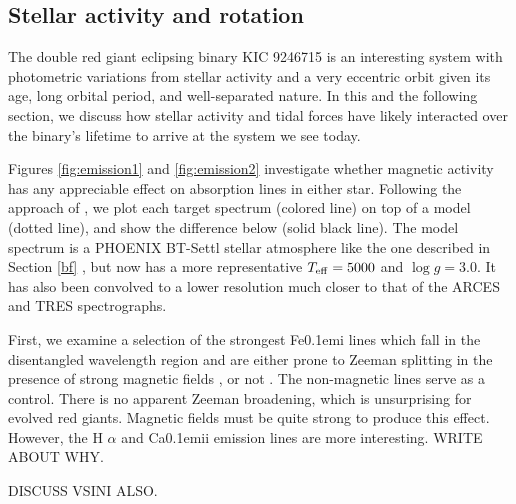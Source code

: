 \subsection{Stellar activity and rotation}\label{actrot}
The double red giant eclipsing binary KIC 9246715 is an interesting system with photometric variations from stellar activity and a very eccentric orbit given its age, long orbital period, and well-separated nature. In this and the following section, we discuss how stellar activity and tidal forces have likely interacted over the binary's lifetime to arrive at the system we see today.

Figures \ref{fig:emission1} and \ref{fig:emission2} investigate whether magnetic activity has any appreciable effect on absorption lines in either star. Following the approach of \citet{fro12}, we plot each target spectrum (colored line) on top of a model (dotted line), and show the difference below (solid black line). The model spectrum is a PHOENIX BT-Settl stellar atmosphere like the one described in Section \ref{bf} \citep{all03,asp09}, but now has a more representative $T_{\rm{eff}} = 5000$ and $\log g = 3.0$. It has also been convolved to a lower resolution much closer to that of the ARCES and TRES spectrographs.

First, we examine a selection of the strongest  {\rm Fe}\kern 0.1em{\sc i} lines which fall in the disentangled wavelength region and are either prone to Zeeman splitting in the presence of strong magnetic fields \citep{har73}, or not \citep{sis70}. The non-magnetic lines serve as a control. There is no apparent Zeeman broadening, which is unsurprising for evolved red giants. Magnetic fields must be quite strong to produce this effect. However, the H $\alpha$ and {\rm Ca}\kern 0.1em{\sc ii} emission lines are more interesting. WRITE ABOUT WHY.

DISCUSS VSINI ALSO.
  
  
  
  
  